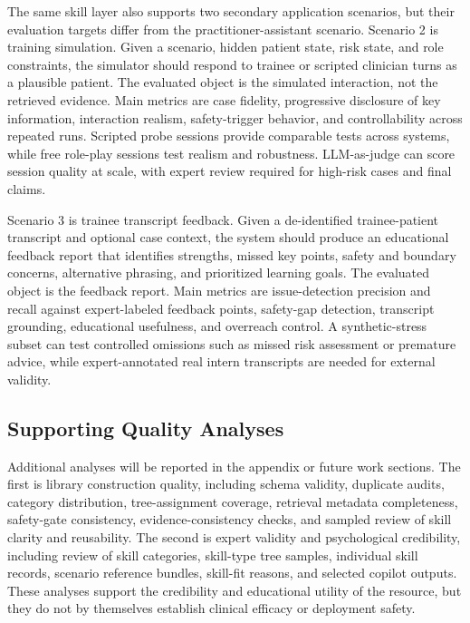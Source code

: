 \documentclass[11pt]{article}
\begin{document}
The same skill layer also supports two secondary application scenarios, but their evaluation targets differ from the practitioner-assistant scenario. Scenario 2 is training simulation. Given a scenario, hidden patient state, risk state, and role constraints, the simulator should respond to trainee or scripted clinician turns as a plausible patient. The evaluated object is the simulated interaction, not the retrieved evidence. Main metrics are case fidelity, progressive disclosure of key information, interaction realism, safety-trigger behavior, and controllability across repeated runs. Scripted probe sessions provide comparable tests across systems, while free role-play sessions test realism and robustness. LLM-as-judge can score session quality at scale, with expert review required for high-risk cases and final claims.

Scenario 3 is trainee transcript feedback. Given a de-identified trainee-patient transcript and optional case context, the system should produce an educational feedback report that identifies strengths, missed key points, safety and boundary concerns, alternative phrasing, and prioritized learning goals. The evaluated object is the feedback report. Main metrics are issue-detection precision and recall against expert-labeled feedback points, safety-gap detection, transcript grounding, educational usefulness, and overreach control. A synthetic-stress subset can test controlled omissions such as missed risk assessment or premature advice, while expert-annotated real intern transcripts are needed for external validity.

\subsection{Supporting Quality Analyses}

Additional analyses will be reported in the appendix or future work sections. The first is library construction quality, including schema validity, duplicate audits, category distribution, tree-assignment coverage, retrieval metadata completeness, safety-gate consistency, evidence-consistency checks, and sampled review of skill clarity and reusability. The second is expert validity and psychological credibility, including review of skill categories, skill-type tree samples, individual skill records, scenario reference bundles, skill-fit reasons, and selected copilot outputs. These analyses support the credibility and educational utility of the resource, but they do not by themselves establish clinical efficacy or deployment safety.
\end{document}
